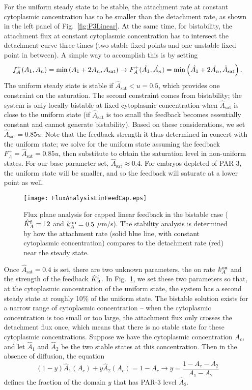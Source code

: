 \documentclass[11pt]{article}
\newcommand{\6}[1]{#1_{\text{6}}}
\newcommand{\3}[1]{#1_{\text{3}}}
\begin{document}
For the uniform steady state to be stable, the attachment rate at constant cytoplasmic concentration has to be smaller than the detachment rate, as shown in the left panel of Fig.\ \ref{fig:P3Linear}. At the same time, for bistability, the attachment flux at constant cytoplasmic concentration has to intersect the detachment curve three times (two stable fixed points and one unstable fixed point in between). A simple way to accomplish this is by setting
\begin{equation}
f_A^+(A_1,A_n) =\min\left(A_1+2A_n,A_\text{sat}\right) \rightarrow F_A^+(\hat {A_1}, \hat {A_n}) = \min\left(\hat {A_1}+2\hat {A_n}, \hat A_\text{sat}\right). 
\end{equation}
The uniform steady state is stable if $\hat A_\text{sat} < u = 0.5$, which provides one constraint on the saturation. The second constraint comes from bistability; the system is only locally bistable at fixed cytoplasmic concentration when $\hat A_\text{sat}$ is close to the uniform state (if $\hat A_\text{sat}$ is too small the feedback becomes essentially constant and cannot generate bistability). Based on these considerations, we set $\hat A_\text{sat}=0.85 u$. Note that the feedback strength it thus determined in concert with the uniform state; we solve for the uniform state assuming the feedback $ F_A^+=\hat A_\text{sat}=0.85 u$, then substitute to obtain the saturation level in non-uniform states. For our base parameter set, $\hat A_\text{sat} \approx 0.4$. For embryos depleted of PAR-3, the uniform state will be smaller, and so the feedback will saturate at a lower point as well.  


\begin{figure}
\centering
\texttt{[image: FluxAnalysisLinFeedCap.eps]}
\caption{\label{fig:P3Cap}Flux plane analysis for capped linear feedback in the bistable case ($\hat{K}^\text{f}_A=12$ and $k^\text{on}_A=0.5$ $\mu$m/s). The stability analysis is determined by how the attachment rate (solid blue line, with constant cytoplasmic concentration) compares to the detachment rate (red) near the steady state. }
\end{figure}

Once $\hat A_\text{sat}=0.4$ is set, there are two unknown parameters, the on rate $k^\text{on}_A$ and the strength of the feedback $\hat{K}^\text{f}_A$. In Fig.\ \ref{fig:P3Cap}, we set these two parameters so that, at the cytoplasmic concentration of the uniform state, the system has a second steady state at roughly 10\% of the uniform state. The bistable solution exists for a narrow range of cytoplasmic concentration -- when the cytoplasmic concentration is too small or too large, the attachment flux only crosses the detachment flux once, which means that there is no stable state for these cytoplasmic concentrations. Suppose we have the cytoplasmic concentration $A_c$, and let $\hat A_1$ and $\hat A_2$ be the two stable states at this concentration. Then in the absence of diffusion, the equation 
\begin{equation}
\label{eq:NoDiffEqn}
(1-y)\hat{A}_1\left(A_c\right)+y \hat{A}_2\left(A_c\right)=1-A_c \rightarrow y = \frac{1-A_c-A_2}{A_1-A_2}
\end{equation}
defines the fraction of the domain $y$ that has PAR-3 level $\hat A_2$.
\end{document}
